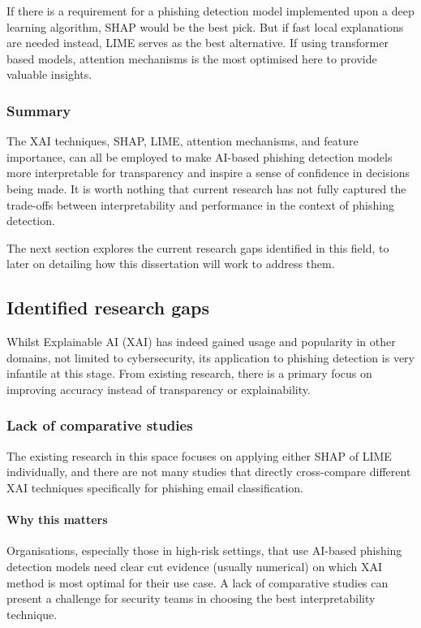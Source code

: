 \noindent If there is a requirement for a phishing detection model implemented upon a deep learning algorithm, SHAP would be the best pick. But if fast local explanations are needed instead, LIME serves as the best alternative. If using transformer based models, attention mechanisms is the most optimised here to provide valuable insights.

\subsubsection*{Summary}

\noindent The XAI techniques, SHAP, LIME, attention mechanisms, and feature importance, can all be employed to make AI-based phishing detection models more interpretable for transparency and inspire a sense of confidence in decisions being made. It is worth nothing that current research has not fully captured the trade-offs between interpretability and performance in the context of phishing detection.\newline

\noindent The next section explores the current research gaps identified in this field, to later on detailing how this dissertation will work to address them.

\newpage

\subsection*{Identified research gaps}
Whilst Explainable AI (XAI) has indeed gained usage and popularity in other domains, not limited to cybersecurity, its application to phishing detection is very infantile at this stage. From existing research, there is a primary focus on improving accuracy instead of transparency or explainability.

\subsubsection*{Lack of comparative studies}
The existing research in this space focuses on applying either SHAP of LIME individually, and there are not many studies that directly cross-compare different XAI techniques specifically for phishing email classification.

\paragraph{Why this matters}
Organisations, especially those in high-risk settings, that use AI-based phishing detection models need clear cut evidence (usually numerical) on which XAI method is most optimal for their use case. A lack of comparative studies can present a challenge for security teams in choosing the best interpretability technique.

